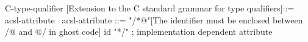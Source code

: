 \begin{syntax}
C-type-qualifier [Extension to the C  standard grammar for type qualifiers]::= acsl-attribute
\
acsl-attribute ::= "/*@"[The identifier must be enclosed between /@ and @/ in ghost code] id "*/" ; implementation dependent attribute
\end{syntax}
